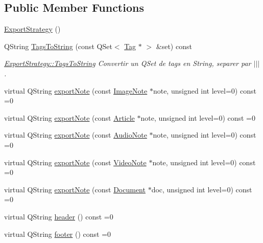 \subsection*{Public Member Functions}
\begin{DoxyCompactItemize}
\item 
\hyperlink{class_export_strategy_a68b6eb4efdf00b2f8ad4d8c6636b6192}{Export\-Strategy} ()
\item 
Q\-String \hyperlink{class_export_strategy_a6822e5b6ea45acf832e2e0eada6c99d5}{Tags\-To\-String} (const Q\-Set$<$ \hyperlink{class_tag}{Tag} $\ast$ $>$ \&set) const 
\begin{DoxyCompactList}\small\item\em \hyperlink{class_export_strategy_a6822e5b6ea45acf832e2e0eada6c99d5}{Export\-Strategy\-::\-Tags\-To\-String} Convertir un Q\-Set de tags en String, separer par $|$$|$$|$. \end{DoxyCompactList}\item 
virtual Q\-String \hyperlink{class_export_strategy_ab1e0f0289ee569bda5ddf581c294a0e3}{export\-Note} (const \hyperlink{class_image_note}{Image\-Note} $\ast$note, unsigned int level=0) const =0
\item 
virtual Q\-String \hyperlink{class_export_strategy_ac4620b38512cada7869aa2a18d29cc05}{export\-Note} (const \hyperlink{class_article}{Article} $\ast$note, unsigned int level=0) const =0
\item 
virtual Q\-String \hyperlink{class_export_strategy_ab6935beb7adfde2a6435ab912732aba8}{export\-Note} (const \hyperlink{class_audio_note}{Audio\-Note} $\ast$note, unsigned int level=0) const =0
\item 
virtual Q\-String \hyperlink{class_export_strategy_ac1d6a027448434eb99198e7f8370c8ad}{export\-Note} (const \hyperlink{class_video_note}{Video\-Note} $\ast$note, unsigned int level=0) const =0
\item 
virtual Q\-String \hyperlink{class_export_strategy_a2b4271cd27136240eb11102d8f2ee3c7}{export\-Note} (const \hyperlink{class_document}{Document} $\ast$doc, unsigned int level=0) const =0
\item 
virtual Q\-String \hyperlink{class_export_strategy_a8f24eb340762e0c1b1faaefb32087468}{header} () const =0
\item 
virtual Q\-String \hyperlink{class_export_strategy_aa7640ca5f382c7264697e594cd1288ff}{footer} () const =0
\end{DoxyCompactItemize}
